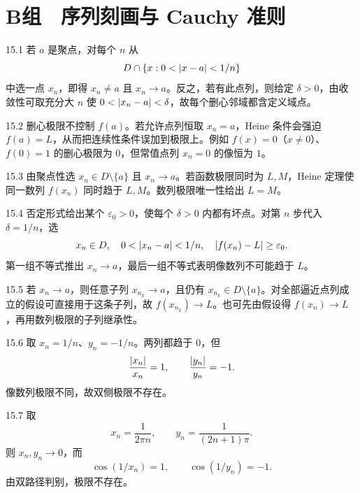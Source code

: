 \section*{B组　序列刻画与 Cauchy 准则}

\begin{solution}{15.1}
若 \(a\) 是聚点，对每个 \(n\) 从
\[
 D\cap\{x:0<\left|x-a\right|<1/n\}
\]
中选一点 \(x_n\)，即得 \(x_n\ne a\) 且 \(x_n\to a\)。反之，若有此点列，则给定 \(\delta>0\)，由收敛性可取充分大 \(n\) 使 \(0<\left|x_n-a\right|<\delta\)，故每个删心邻域都含定义域点。
\end{solution}

\begin{solution}{15.2}
删心极限不控制 \(f(a)\)。若允许点列恒取 \(x_n=a\)，Heine 条件会强迫 \(f(a)=L\)，从而把连续性条件误加到极限上。例如 \(f(x)=0\)（\(x\ne0\)）、\(f(0)=1\) 的删心极限为 \(0\)，但常值点列 \(x_n=0\) 的像恒为 \(1\)。
\end{solution}

\begin{solution}{15.3}
由聚点性选 \(x_n\in D\setminus\{a\}\) 且 \(x_n\to a\)。若函数极限同时为 \(L,M\)，Heine 定理使同一数列 \(f(x_n)\) 同时趋于 \(L,M\)。数列极限唯一性给出 \(L=M\)。
\end{solution}

\begin{solution}{15.4}
否定形式给出某个 \(\varepsilon_0>0\)，使每个 \(\delta>0\) 内都有坏点。对第 \(n\) 步代入 \(\delta=1/n\)，选
\[
 x_n\in D,\quad0<\left|x_n-a\right|<1/n,\quad
 \left|f(x_n)-L\right|\ge\varepsilon_0.
\]
第一组不等式推出 \(x_n\to a\)，最后一组不等式表明像数列不可能趋于 \(L\)。
\end{solution}

\begin{solution}{15.5}
若 \(x_n\to a\)，则任意子列 \(x_{n_k}\to a\)，且仍有 \(x_{n_k}\in D\setminus\{a\}\)。对全部逼近点列成立的假设可直接用于这条子列，故 \(f(x_{n_k})\to L\)。也可先由假设得 \(f(x_n)\to L\)，再用数列极限的子列继承性。
\end{solution}

\begin{solution}{15.6}
取 \(x_n=1/n\)、\(y_n=-1/n\)。两列都趋于 \(0\)，但
\[
 \frac{\left|x_n\right|}{x_n}=1,\qquad
 \frac{\left|y_n\right|}{y_n}=-1.
\]
像数列极限不同，故双侧极限不存在。
\end{solution}

\begin{solution}{15.7}
取
\[
 x_n=\frac1{2\pi n},\qquad y_n=\frac1{(2n+1)\pi}.
\]
则 \(x_n,y_n\to0\)，而
\[
 \cos(1/x_n)=1,\qquad \cos(1/y_n)=-1.
\]
由双路径判别，极限不存在。
\end{solution}

